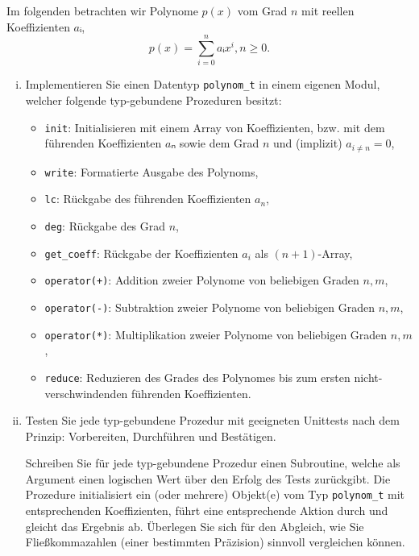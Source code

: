 
\NewDocumentCommand{}
\date{Ausgabe: Di, 18.06.2019, Besprechung: Fr, 28.06.2019}
\setcounter{question}{16}

\DeclareMathOperator{\odeg}{deg}



\maketitle

\begin{question}[subtitle=Polynome und Unittests]
  Im folgenden betrachten wir Polynome $p(x)$ vom Grad $n$ mit reellen Koeffizienten $aᵢ$,
  \begin{equation}
    p(x) = ∑_{i = 0}^n aᵢ x^i, n ≥ 0.
  \end{equation}
  \begin{enumerate}[(i)]
  \item Implementieren Sie einen Datentyp \texttt{polynom_t} in einem eigenen Modul, welcher folgende typ-gebundene Prozeduren besitzt:
    \begin{itemize}
    \item \texttt{init}: Initialisieren mit einem Array von Koeffizienten, bzw. mit dem führenden Koeffizienten $aₙ$ sowie dem Grad $n$ und (implizit) $a_{i ≠ n} = 0$,
    \item \texttt{write}: Formatierte Ausgabe des Polynoms,
    \item \texttt{lc}: Rückgabe des führenden Koeffizienten $a_n$,
    \item \texttt{deg}: Rückgabe des Grad $n$,
    \item \texttt{get_coeff}: Rückgabe der Koeffizienten $a_i$ als $(n+1)$-Array,
    \item \texttt{operator(+)}: Addition zweier Polynome von beliebigen Graden $n, m$,
    \item \texttt{operator(-)}: Subtraktion zweier Polynome von beliebigen Graden $n, m$,
    \item \texttt{operator(*)}: Multiplikation zweier Polynome von beliebigen Graden $n, m$,
    \item \texttt{reduce}: Reduzieren des Grades des Polynomes bis zum ersten nicht-verschwindenden führenden Koeffizienten.
    \end{itemize}
  \item Testen Sie jede typ-gebundene Prozedur mit geeigneten Unittests nach dem Prinzip: Vorbereiten, Durchführen und Bestätigen.

    Schreiben Sie für jede typ-gebundene Prozedur einen Subroutine, welche als Argument einen logischen Wert über den Erfolg des Tests zurückgibt.
    Die Prozedure initialisiert ein (oder mehrere) Objekt(e) vom Typ \texttt{polynom_t} mit entsprechenden Koeffizienten, führt eine entsprechende Aktion durch und gleicht das Ergebnis ab.
    Überlegen Sie sich für den Abgleich, wie Sie Fließkommazahlen (einer bestimmten Präzision) sinnvoll vergleichen können.
  \end{enumerate}
\end{question}

